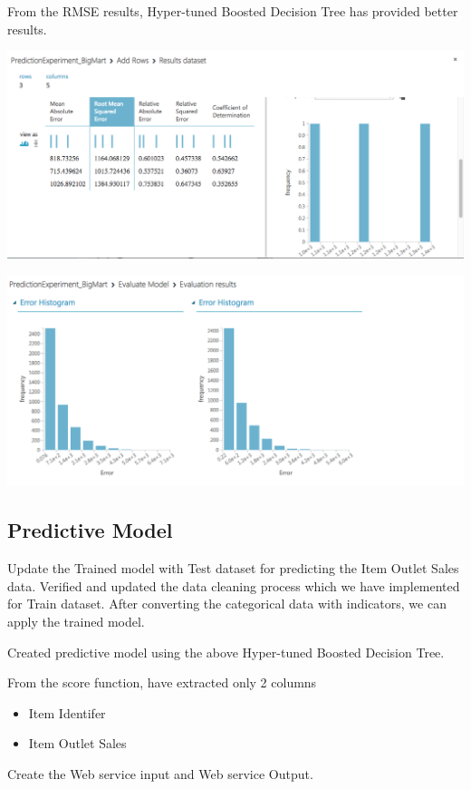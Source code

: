 From the RMSE results, Hyper-tuned Boosted Decision Tree has provided better 
results.


\includegraphics[width=\columnwidth]{Images/mlstudio/RMSEComparison.png}


\includegraphics[width=\columnwidth]
{Images/mlstudio/RMSEComparisionBetweenHypertune.png}


\subsection{Predictive Model}
Update the Trained model with Test dataset for predicting the Item Outlet 
Sales data. Verified and updated the data cleaning process which we have 
implemented for Train dataset. After converting the categorical data with 
indicators, we can apply the trained model.

Created predictive model using the above Hyper-tuned Boosted Decision Tree.

From the score function, have extracted only 2 columns
\begin{itemize}
\item Item Identifer
\item Item Outlet Sales
\end{itemize}

Create the Web service input and Web service Output.


